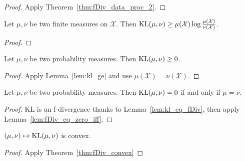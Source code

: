 \begin{proof} \leanok
{}
Apply Theorem~\ref{thm:fDiv_data_proc_2}.
\end{proof}

\begin{lemma}
  \label{lem:kl_ge}
  \leanok
  Let $\mu, \nu$ be two finite measures on $\mathcal X$. Then $\operatorname{KL}(\mu, \nu) \ge \mu(\mathcal X) \log \frac{\mu(\mathcal X)}{\nu(\mathcal X)}$.
\end{lemma}

\begin{proof}\leanok
{}
\end{proof}

\begin{lemma}
  \label{lem:kl_nonneg}
  \leanok
  Let $\mu, \nu$ be two probability measures. Then $\operatorname{KL}(\mu, \nu) \ge 0$.
\end{lemma}

\begin{proof}\leanok
{}
Apply Lemma~\ref{lem:kl_ge} and use $\mu(\mathcal X) = \nu (\mathcal X)$.
\end{proof}

\begin{lemma}
  \label{lem:kl_eq_zero_iff}
  \leanok
  Let $\mu, \nu$ be two probability measures. Then $\operatorname{KL}(\mu, \nu) = 0$ if and only if $\mu = \nu$.
\end{lemma}

\begin{proof}\leanok
{}
KL is an f-divergence thanks to Lemma~\ref{lem:kl_eq_fDiv}, then apply Lemma~\ref{lem:fDiv_eq_zero_iff}.
\end{proof}

\begin{lemma}
  \label{lem:kl_convex}
  $(\mu, \nu) \mapsto \operatorname{KL}(\mu, \nu)$ is convex.
\end{lemma}

\begin{proof}
Apply Theorem~\ref{thm:fDiv_convex}
\end{proof}


